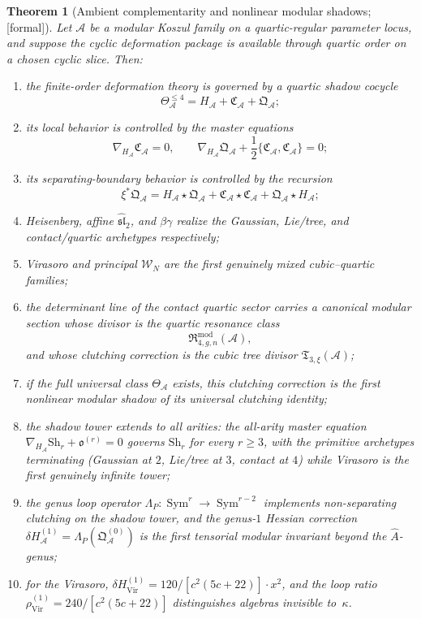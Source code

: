 \documentclass[11pt,oneside]{memoir}
\numberwithin{equation}{chapter}
\newtheorem{theorem}{Theorem}[chapter]
\theoremstyle{definition}
\newcommand{\ClaimStatusProvedHere}{\textnormal{[formal]}}
\newcommand{\cA}{\mathcal A}
\begin{document}
\begin{theorem}[Ambient complementarity and nonlinear modular shadows; \ClaimStatusProvedHere]
\label{thm:nms-unified-summary}
Let $\cA$ be a modular Koszul family on a quartic-regular parameter locus, and suppose the cyclic deformation package is available through quartic order on a chosen cyclic slice.  Then:
\begin{enumerate}[label=\textup{(\roman*)}]
\item the finite-order deformation theory is governed by a quartic shadow cocycle
\[
\Theta_{\cA}^{\le 4}=H_{\cA}+\mathfrak C_{\cA}+\mathfrak Q_{\cA};
\]
\item its local behavior is controlled by the master equations
\[
\nabla_{H_{\cA}}\mathfrak C_{\cA}=0,
\qquad
\nabla_{H_{\cA}}\mathfrak Q_{\cA}+\frac12\{\mathfrak C_{\cA},\mathfrak C_{\cA}\}=0;
\]
\item its separating-boundary behavior is controlled by the recursion
\[
\xi^*\mathfrak Q_{\cA}
=
H_{\cA}\star \mathfrak Q_{\cA}
+
\mathfrak C_{\cA}\star \mathfrak C_{\cA}
+
\mathfrak Q_{\cA}\star H_{\cA};
\]
\item Heisenberg, affine $\widehat{\mathfrak{sl}}_2$, and $\beta\gamma$ realize the Gaussian, Lie/tree, and contact/quartic archetypes respectively;
\item Virasoro and principal $\mathcal W_N$ are the first genuinely mixed cubic--quartic families;
\item the determinant line of the contact quartic sector carries a canonical modular section whose divisor is the quartic resonance class
\[
\mathfrak R_{4,g,n}^{\mathrm{mod}}(\cA),
\]
and whose clutching correction is the cubic tree divisor $\mathfrak T_{3,\xi}(\cA)$;
\item if the full universal class $\Theta_{\cA}$ exists, this clutching correction is the first nonlinear modular shadow of its universal clutching identity;
\item the shadow tower extends to all arities: the all-arity master equation $\nabla_{H_{\cA}}\mathrm{Sh}_r+\mathfrak o^{(r)}=0$ governs $\mathrm{Sh}_r$ for every $r\ge 3$, with the primitive archetypes terminating (Gaussian at $2$, Lie/tree at $3$, contact at $4$) while Virasoro is the first genuinely infinite tower;
\item the genus loop operator $\Lambda_P:\operatorname{Sym}^r\to\operatorname{Sym}^{r-2}$ implements non-separating clutching on the shadow tower, and the genus-$1$ Hessian correction $\delta H^{(1)}_{\cA}=\Lambda_P(\mathfrak Q_{\cA}^{(0)})$ is the first tensorial modular invariant beyond the $\hat{A}$-genus;
\item for the Virasoro, $\delta H^{(1)}_{\mathrm{Vir}}=120/[c^2(5c+22)]\cdot x^2$, and the loop ratio $\rho^{(1)}_{\mathrm{Vir}}=240/[c^2(5c+22)]$ distinguishes algebras invisible to~$\kappa$.
\end{enumerate}
\end{theorem}
\end{document}
